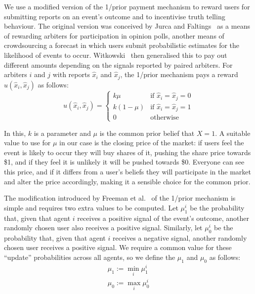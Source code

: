 We use a modified version of the 1/prior payment mechanism to reward users for
submitting reports on an event's outcome and to incentivise truth telling
behaviour. The original version was conceived by Jurca and
Faltings~\cite{JurcaFaltings2008, JurcaFaltings2011} as a means of rewarding
arbiters for participation in opinion polls, another means of crowdsourcing a
forecast in which users submit probabilistic estimates for the likelihood of
events to occur. Witkowski~\cite{Witkowski2014} then generalised this to pay
out different amounts depending on the signals reported by paired arbiters. For
arbiters $i$ and $j$ with reports $\hat{x}_i$ and $\hat{x}_j$, the 1/prior
mechanism pays a reward $u(\hat{x}_i, \hat{x}_j)$ as follows:
%
\begin{equation}
	\label{eq:oneOverPrior}
	u(\hat{x}_i, \hat{x}_j) =
	\begin{cases}
		k \mu & \text{if } \hat{x}_i = \hat{x}_j = 0 \\
		k (1-\mu) & \text{if } \hat{x}_i = \hat{x}_j = 1 \\
		0 & \text{otherwise}
	\end{cases}
\end{equation}

In this, $k$ is a parameter and $\mu$ is the common prior belief that $X=1$. A
suitable value to use for $\mu$ in our case is the closing price of the market:
if users feel the event is likely to occur they will buy shares of it, pushing
the share price towards \$1, and if they feel it is unlikely it will be pushed
towards \$0. Everyone can see this price, and if it differs from a user's
beliefs they will participate in the market and alter the price accordingly,
making it a sensible choice for the common prior.

The modification introduced by Freeman et al.~\cite{Freeman2017} of the 1/prior
mechanism is simple and requires two extra values to be computed. Let $\mu_1^i$
be the probability that, given that agent $i$ receives a positive signal of the
event's outcome, another randomly chosen user also receives a positive signal.
Similarly, let $\mu_0^i$ be the probability that, given that agent $i$ receives
a negative signal, another randomly chosen user receives a positive signal. We
require a common value for these ``update'' probabilities across all agents, so
we define the $\mu_1$ and $\mu_0$ as follows:
%
\begin{equation}
	\begin{gathered}
		\mu_1 := \min_i \mu_1^i \\
		\mu_0 := \max_i \mu_0^i
	\end{gathered}
\end{equation}


